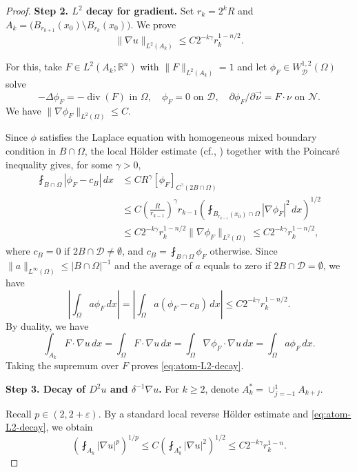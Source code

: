 \documentclass[12pt]{amsart}
\numberwithin{equation}{section}
\newcommand{\bR}{\mathbb{R}}
\newcommand\cD{\mathcal{D}}
\newcommand\cN{\mathcal{N}}
\newcommand{\p}{\partial}
\newcommand{\epsi}{\varepsilon}
\begin{document}
\begin{proof}
\noindent\textbf{Step 2. $L^2$ decay for gradient.}
Set $r_k=2^kR$ and $A_k=\bigl(B_{r_{k+1}}(x_0)\setminus B_{r_k}(x_0)\bigr)$. We prove
\begin{equation}
 \|\nabla u\|_{L^2(A_k)}
 \leq C2^{-k\gamma}r_k^{1-n/2}.
 \label{eq:atom-L2-decay}
\end{equation}

For this, take $F\in L^2(A_k;\bR^n)$ with $\|F\|_{L^2(A_k)}=1$ and let
$\phi_F\in W_{\cD}^{1,2}(\Omega)$ solve
\[
 -\Delta \phi_F = -\operatorname{div}(F)\,\,\text{in}\,\,\Omega,
 \quad
 \phi_F = 0\,\,\text{on}\,\,\cD,
 \quad
 \p \phi_F/\p \vec{\nu} = F\cdot\nu\,\,\text{on}\,\,\cN.
\]
We have $\|\nabla\phi_F\|_{L^2(\Omega)}\leq C$.

Since $\phi$ satisfies the Laplace equation with homogeneous mixed boundary condition in $B \cap \Omega$, the local H\"older estimate (cf., \cite[Theorem~3.1]{MR3034453}) together with the Poincar\'e inequality gives, for some $\gamma>0$,
\begin{align*}
 \fint_{B\cap\Omega}|\phi_F-c_B|\,dx
 &\leq C R^\gamma [\phi_F]_{C^\gamma(2 B\cap\Omega)}
 \\&\leq C\left(\frac R{r_{k-1}}\right)^\gamma r_{k-1}
 \left(\fint_{B_{r_{k-1}}(x_0)\cap\Omega}|\nabla\phi_F|^2\,dx\right)^{1/2}\\
 &\leq C2^{-k\gamma}r_k^{1-n/2} \|\nabla \phi_F\|_{L^2(\Omega)} 
 \leq C2^{-k\gamma}r_k^{1-n/2},
\end{align*}
where $c_B=0$ if $2B\cap\cD\neq\emptyset$, and $c_B = \fint_{B\cap \Omega} \phi_F$ otherwise.
Since $\|a\|_{L^{\infty}(\Omega)} \leq|B\cap\Omega|^{-1}$ and the average of $a$ equals to zero if $2B\cap \cD = \emptyset$, we have
\[
 \left|\int_\Omega a\phi_F\,dx\right|
 =\left|\int_\Omega a(\phi_F-c_B)\,dx\right|
 \leq C2^{-k\gamma}r_k^{1-n/2}.
\]
By duality, we have
\[
 \int_{A_k}F\cdot\nabla u\,dx
 =\int_\Omega F\cdot \nabla u\,dx
 =\int_\Omega\nabla\phi_F\cdot\nabla u\,dx
 =\int_\Omega a\phi_F\,dx.
\]
Taking the supremum over $F$ proves \eqref{eq:atom-L2-decay}.

\medskip
\noindent \textbf{Step 3. Decay of $D^2u$ and $\delta^{-1}\nabla u$.} For $k \geq 2$, denote $A_k^* = \cup_{j=-1}^1 A_{k+j}$.

Recall $p \in (2,2+\epsi)$. By a standard local reverse H\"older estimate and \eqref{eq:atom-L2-decay}, we obtain
\begin{equation}
 (\fint_{A_k} |\nabla u|^p)^{1/p}
 \leq C (\fint_{A_k^*}  |\nabla u|^2)^{1/2}
 \leq C2^{-k\gamma}r_k^{1-n}.
 \label{eq:atom-Lp-decay}
\end{equation}


\end{proof}
\end{document}
